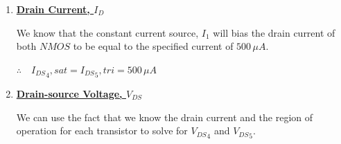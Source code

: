 \documentclass[12pt, fleqn]{article}
\begin{document}
\begin{enumerate}[label=(\alph*)]
{\begin{enumerate}[label=(\roman*)]
{        \vspace{0.15cm}
        This is a series $NMOS$ setup, with the transistor $M_4$ being diode-connected. One property of a diode-connected transistor is that it is always in saturation.  The gate of $M_5$ is also tied to the supply rail, so we know that it will exceed the threshold voltage and be turned on.  However, this one will be operating in the triode region.  The reason for this is because ${V_{D_5}}$ cannot larger than or equal to $0.5\,V$, or the top transistor would go into cut-off mode, which contradicts the condition that it must be in saturation.  Since there is no voltage drop across an ideal current source, with ${V_{DS_5}} < 0.5\,V$, $M_5$ cannot be in saturation.
        
        \vspace{0.25cm}
        $\boxed{\therefore\quad{\text{$M_4$ is in \textit{saturation}, $M_5$ is in \textit{triode}.}}}$
        }
        \vspace{0.25cm}
        \item
        {
        \underline{\textbf{Drain Current, $I_D$}}
        
        \vspace{0.15cm}
        We know that the constant current source, $I_1$ will bias the drain current of both $NMOS$ to be equal to the specified current of $500\,\mu A$.
        
        \vspace{0.25cm}
        $\boxed{\therefore\quad {I_{DS}}_4,sat = {I_{DS}}_5,tri = 500\,\mu A}$
        \vspace{0.25cm}
        }
        \newpage\noindent
        \item
        {
        \underline{\textbf{Drain-source Voltage, $V_{DS}$}}
        
        \vspace{0.15cm}
        We can use the fact that we know the drain current and the region of operation for each transistor to solve for ${V_{DS}}_4$ and ${V_{DS}}_5$.
        
}
\end{enumerate}}
\end{enumerate}
\end{document}

